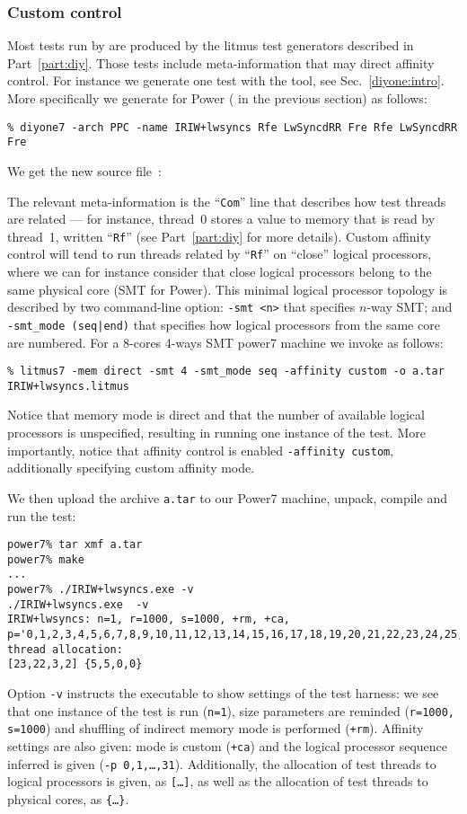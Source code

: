 \subsubsection{Custom\label{affinity:custom} control}
Most tests run by \litmus{} are produced by the litmus test generators
described in Part~\ref{part:diy}.
Those tests include meta-information that may direct affinity control.
For instance we generate one test with the
\diyone{} tool, see Sec.~\ref{diyone:intro}.
More specifically we generate
 for Power
( in the previous
section) as follows:
\begin{verbatim}
% diyone7 -arch PPC -name IRIW+lwsyncs Rfe LwSyncdRR Fre Rfe LwSyncdRR Fre
\end{verbatim}
We get the new source file~:

The relevant meta-information  is the ``\texttt{Com}'' line that describes
how test threads are related --- for instance, thread~0 stores a value
to memory that is read by thread~1, written ``\texttt{Rf}'' (see Part~\ref{part:diy} for more details).
Custom affinity control will tend to run threads related by ``\texttt{Rf}''
on ``close'' logical processors, where we can for instance consider
that close logical processors belong to the same physical core (SMT for Power).
This minimal logical processor topology is described by two \litmus{}
command-line option: \texttt{-smt <n>} that specifies $n$-way SMT;
and \texttt{-smt\_mode (seq|end)} that specifies how logical processors
from the same core are numbered.
For a 8-cores 4-ways SMT power7 machine we invoke \litmus{} as follows:
\begin{verbatim}
% litmus7 -mem direct -smt 4 -smt_mode seq -affinity custom -o a.tar IRIW+lwsyncs.litmus
\end{verbatim}
Notice that memory mode is direct and that the number of available
logical processors is unspecified, resulting in running one instance of
the test. More importantly, notice that affinity control is enabled
\texttt{-affinity custom}, additionally specifying custom affinity mode.

We then upload the archive \texttt{a.tar} to our Power7 machine,
unpack, compile and run the test:
\begin{verbatim}
power7% tar xmf a.tar
power7% make
...
power7% ./IRIW+lwsyncs.exe -v
./IRIW+lwsyncs.exe  -v
IRIW+lwsyncs: n=1, r=1000, s=1000, +rm, +ca, p='0,1,2,3,4,5,6,7,8,9,10,11,12,13,14,15,16,17,18,19,20,21,22,23,24,25,26,27,28,29,30,31'
thread allocation: 
[23,22,3,2] {5,5,0,0}
\end{verbatim}
Option \texttt{-v} instructs the executable to show settings of the test harness: we see that one instance of the test is run (\texttt{n=1}),
size parameters are reminded (\texttt{r=1000, s=1000}) and
shuffling of indirect memory mode is performed (\texttt{+rm}).
Affinity settings are also given: mode is custom (\texttt{+ca}) and
the logical processor sequence inferred is given (\texttt{-p 0,1,\ldots,31}).
Additionally, the allocation  of test threads to logical processors is
given, as \texttt{[\ldots]}, as well as the allocation  of test threads
to physical cores, as \texttt{\{\ldots\}}.

